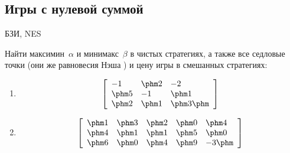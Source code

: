\subsection{Игры с нулевой суммой}



\begin{problem}
\begin{source}
БЗИ, NES
\end{source} Найти
максимин~$\alpha$ и минимакс~$\beta$ в чистых стратегиях, а
также все седловые точки (они же равновесия Нэша ) и цену
игры в смешанных стратегиях:

\begin{enumerate}

\item \[\left[\begin{array}{lll} -1&\phm 2&-2\\ \phm 5&-1&\phm 1\\
\phm 2&\phm 1&\phm 3\phm \\
\end{array}\right]\]

\bigskip

\item \[\left[\begin{array}{lllll} \phm 1&\phm 3&\phm 2&\phm 0&\phm 4\\
\phm 4&\phm 1&\phm 1&\phm 5&\phm 0\\ \phm 6&\phm 0&\phm
4&\phm
9&-3\phm \\
\end{array}\right]\]

\end{enumerate}

\begin{sol}

\end{sol}
\end{problem}




